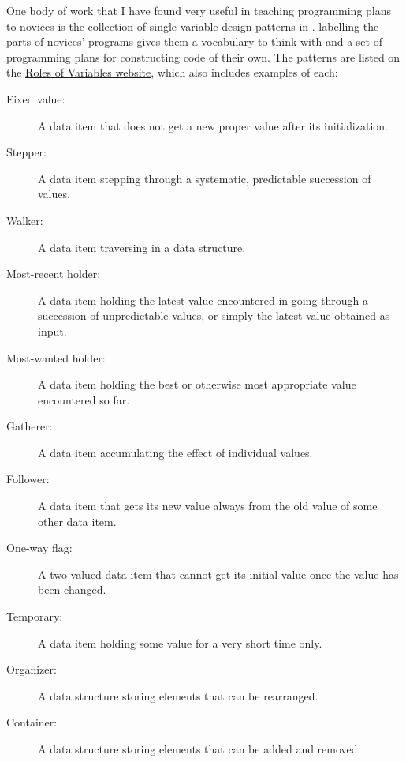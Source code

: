 One body of work that I have found very useful in teaching programming
plans to novices is the collection of single-variable design patterns
in \cite{Kuit2004,Byck2005,Saja2006}.  labelling the parts of novices'
programs gives them a vocabulary to think with and a set of
programming plans for constructing code of their own.  The patterns
are listed on the \href{http://saja.kapsi.fi/var\_roles/}{Roles of
  Variables website}, which also includes examples of each:

\begin{description}

\item[Fixed value:] A data item that does not get a new proper value
  after its initialization.

\item[Stepper:] A data item stepping through a systematic, predictable
  succession of values.

\item[Walker:] A data item traversing in a data structure.

\item[Most-recent holder:] A data item holding the latest value
  encountered in going through a succession of unpredictable values,
  or simply the latest value obtained as input.

\item[Most-wanted holder:] A data item holding the best or otherwise
  most appropriate value encountered so far.

\item[Gatherer:] A data item accumulating the effect of individual
  values.

\item[Follower:] A data item that gets its new value always from the
  old value of some other data item.

\item[One-way flag:] A two-valued data item that cannot get its
  initial value once the value has been changed.

\item[Temporary:] A data item holding some value for a very short time
  only.

\item[Organizer:] A data structure storing elements that can be
  rearranged.

\item[Container:] A data structure storing elements that can be added
  and removed.

\end{description}

